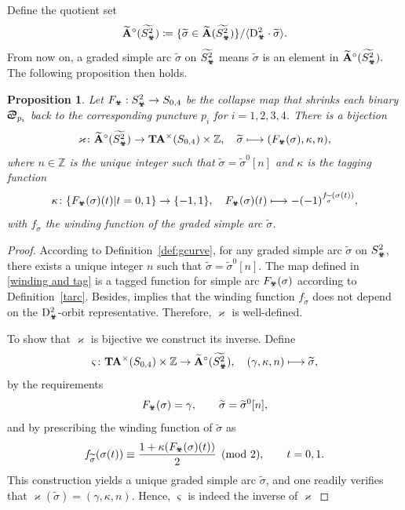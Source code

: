 \documentclass[11pt,a4paper,reqno]{amsart}%
\theoremstyle{plain}
\newtheorem{proposition}[proposition]{Proposition}
\theoremstyle{definition}
\numberwithin{equation}{section}
\numberwithin{equation}{section}
\def\<{\langle}
\def\>{\rangle}
\def\shk{F\x}
\def\ZZ{\mathbb{Z}}
\newcommand{\id}{\operatorname{id}\nolimits}
\def\x{_\vot}
\def\Dfang{\mathrm{D}^2_\vot}
\def\A{\mathbf{A}}
\def\TA{\mathbf{T}\mathbf{A}}
\def\wA{\widetilde{\A}}
\def\vot{\text{\Biohazard}}
\def\sx{\text{\Cancer}}
\begin{document}
Define the quotient set
 \[
\wA^\circ (\widetilde{S\x^2} )\coloneqq\{\widetilde{\sigma}\in\wA (\widetilde{S\x^2} )\}/\< \Dfang\cdot\widetilde{\sigma}\>.
 \]  From now on, a graded simple arc $\widetilde{\sigma}$ on $\widetilde{S\x^2} $ means $\widetilde{\sigma}$ is an element in $\wA^\circ (\widetilde{S\x^2}).$
The following proposition then holds.

 


\begin{proposition}\label{bi:ba-ta} Let  $ \shk:S\x^2\to S_{0,4}$ be the  collapse map that
  shrinks each binary $\sx_{p_i}$ back to the corresponding puncture $p_i$ for $i = 1, 2, 3, 4$.
 There is a bijection
 \[\varkappa\colon
 \wA^\circ(\widetilde{S\x^2} )\to \TA^\times(S_{0,4})\times\ZZ, \quad \widetilde{\sigma} \longmapsto(\shk({\sigma}),\kappa,n),
 \]
 where  $n\in\ZZ$ is the unique integer such that $\widetilde{\sigma}= \widetilde{\sigma}^0[n]$ and $\kappa$ is the tagging function  
 \begin{equation}\label{winding and tag}
\kappa \colon \{\shk({\sigma})(t)|t=0,1 \} \to \{-1,1\}, \quad \shk( {\sigma})(t)\longmapsto  -(-1)^{f_{\widetilde{\sigma}}(\sigma(t))}   , 
\end{equation}
with $f_{\widetilde{\sigma}}$ the winding function of the graded simple arc $\widetilde{\sigma}$.
\end{proposition}
\begin{proof}
According to Definition~\ref{def:gcurve}, for  any graded simple arc $\widetilde{\sigma}$ on $S\x^2$, there exists a unique integer $n$ such that $\widetilde{\sigma}= \widetilde{\sigma}^0[n]$. The map defined in \eqref{winding and tag} is a  tagged function for  simple arc $\shk( {\sigma} )$    according to  Definition~\ref{tarc}. Besides,  implies that the winding function  $f_{\widetilde{\sigma}}$ %
does not depend on    the   $\Dfang$-orbit representative.
 Therefore,  $\varkappa$ is
    well-defined. 
 
   To show that $\varkappa$ is bijective we construct its inverse. 
Define
 \[\varsigma\colon
 \TA^\times(S_{0,4})\times\ZZ \to  \wA^\circ(\widetilde{S\x^2} ), \quad 
 (\gamma,\kappa,n) \longmapsto 
 \widetilde{\sigma}  ,
 \]
 by the requirements
\[
\shk(\sigma)=\gamma,\qquad
\widetilde{\sigma}=\widetilde{\sigma}^0[n],
\]
and by prescribing the winding function of $\widetilde{\sigma}$ as
\[
f_{\widetilde{\sigma}}(\sigma(t))\equiv   \frac{1+\kappa(\shk({\sigma})(t))}{2}\pmod{2} ,\qquad t=0,1.
\]
This construction yields a unique   graded simple arc $\widetilde{\sigma}$, and one readily verifies that $\varkappa(\widetilde{\sigma})=(\gamma,\kappa,n) $. Hence, $\varsigma$ is indeed the inverse of  $\varkappa$
\end{proof}
\end{document}
